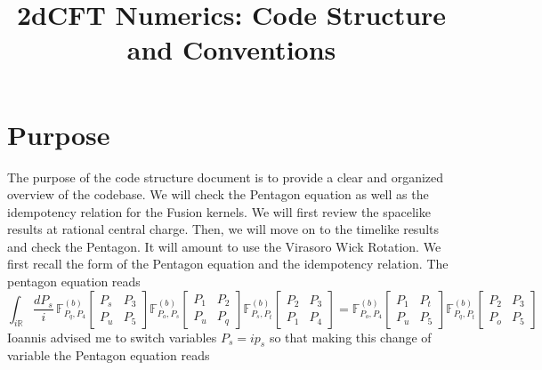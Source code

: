 \documentclass[11pt]{article}
\title{2dCFT Numerics: Code Structure and Conventions}
\begin{document}
\maketitle

\section{Purpose}
The purpose of the code structure document is to provide a clear and organized overview of the codebase. We will check the Pentagon equation as well as the idempotency relation for the Fusion kernels. We will first review the spacelike results at rational central charge. Then, we will move on to the timelike results and check the Pentagon. It will amount to use the Virasoro Wick Rotation. We first recall the form of the Pentagon equation and the idempotency relation. The pentagon equation reads
\begin{equation}
   \int_{i\mathbb{R}} \frac{dP_s}{i} \, \mathbb{F}^{(b)}_{P_q, P_4} 
   \begin{bmatrix}
    P_s & P_3 \\
    P_u & P_5
\end{bmatrix}
\mathbb{F}^{(b)}_{P_o, P_s} 
   \begin{bmatrix}
    P_1 & P_2 \\
    P_u & P_q
\end{bmatrix}
\mathbb{F}^{(b)}_{P_s, P_t} 
   \begin{bmatrix}
    P_2 & P_3 \\
    P_1 & P_4
\end{bmatrix}
= \mathbb{F}^{(b)}_{P_o, P_4} 
   \begin{bmatrix}
    P_1 & P_t \\
    P_u & P_5
\end{bmatrix}
\mathbb{F}^{(b)}_{P_q, P_t} 
   \begin{bmatrix}
    P_2 & P_3 \\
    P_o & P_5
\end{bmatrix}
\end{equation}
Ioannis advised me to switch variables $P_s=ip_s$ so that making this change of variable the Pentagon equation reads
\end{document}
